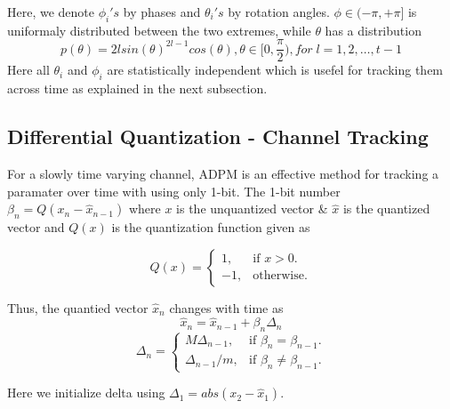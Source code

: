 \documentclass[conference]{IEEEtran}
\begin{document}
Here, we denote $\phi_{i}'s$ by phases and $\theta_{i}'s$ by rotation angles. $\phi \in (-\pi, + \pi]$ is uniformaly distributed between the two extremes\cite{4114278}, while $\theta$ has a distribution
\begin{equation}
p(\theta) = 2lsin(\theta)^{2l-1}cos(\theta), \theta \in [0, \frac{\pi}{2}), for \; l = 1,2,\ldots,t-1
\end{equation} 
Here all $\theta_i$ and $\phi_i$ are statistically independent which is usefel for tracking them across time as explained in the next subsection.

\subsection{Differential Quantization - Channel Tracking}
\label{quantiz}
For a slowly time varying channel, ADPM is an effective method for tracking a paramater over time with using only 1-bit. The 1-bit number $\beta_{n} = Q(x_{n} - \hat{x}_{n-1})$ where $x$ is the unquantized vector \& $\hat{x}$ is the quantized vector and $Q(x)$ is the quantization function given as

\begin{equation}
  Q(x)=\begin{cases}
    1, & \text{if $x>0$}.\\
    -1, & \text{otherwise}.
  \end{cases}
\end{equation}

Thus, the quantied vector $\hat{x}_n$ changes with time as 
\begin{equation}
\hat{x}_{n} = \hat{x}_{n-1} + \beta_{n}\Delta_{n}
\end{equation}
\begin{equation}
\Delta_{n} = \begin{cases}
    M \Delta_{n-1}, & \text{if $\beta_{n} = \beta_{n-1}$}.\\
    \Delta_{n-1}/m , & \text{if $\beta_{n} \neq \beta_{n-1}$}.
  \end{cases}
\end{equation}

Here we initialize delta using $\Delta_1 = abs(x_{2}-\hat{x}_1)$.
\end{document}
